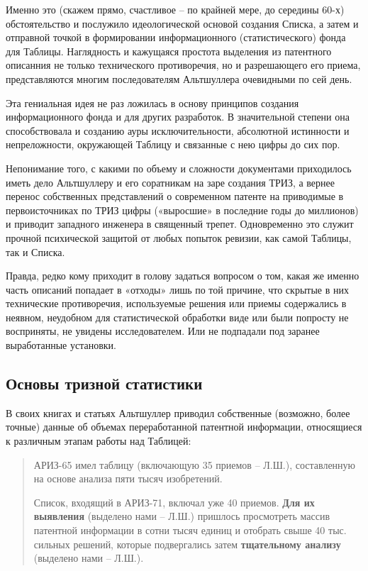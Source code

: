 \documentclass[11pt,a4paper]{article}
\begin{document}
Именно это (скажем прямо, счастливое -- по крайней мере, до середины 60-х)
обстоятельство и послужило идеологической основой создания Списка, а затем и
отправной точкой в формировании информационного (статистического) фонда для
Таблицы. Наглядность и кажущаяся простота выделения из патентного описанния не
только технического противоречия, но и разрешающего его приема, представляются
многим последователям Альтшуллера очевидными по сей день.

Эта гениальная идея не раз ложилась в основу принципов создания
информационного фонда и для других разработок. В значительной степени она
способствовала и созданию ауры исключительности, абсолютной истинности и
непреложности, окружающей Таблицу и связанные с нею цифры до сих пор.

Непонимание того, с какими по объему и сложности документами приходилось иметь
дело Альтшуллеру и его соратникам на заре создания ТРИЗ, а вернее перенос
собственных представлений о современном патенте на приводимые в
первоисточниках по ТРИЗ цифры («выросшие» в последние годы до миллионов) и
приводит западного инженера в священный трепет. Одновременно это служит
прочной психической защитой от любых попыток ревизии, как самой Таблицы, так и
Списка.

Правда, редко кому приходит в голову задаться вопросом о том, какая же именно
часть описаний попадает в «отходы» лишь по той причине, что скрытые в них
технические противоречия, используемые решения или приемы содержались в
неявном, неудобном для статистической обработки виде или были попросту не
восприняты, не увидены исследователем. Или не подпадали под заранее
выработанные установки.

\subsection*{Основы тризной статистики}

В своих книгах и статьях Альтшуллер приводил собственные (возможно, более
точные) данные об объемах переработанной патентной информации, относящиеся к
различным этапам работы над Таблицей:
\begin{quote}
  АРИЗ-65 имел таблицу (включающую 35 приемов -- Л.Ш.), составленную на основе
  анализа пяти тысяч изобретений.  \cite[стр. 139]{Altshuller1973}

  Список, входящий в АРИЗ-71, включал уже 40 приемов. \textbf{Для их
    выявления} (выделено нами -- Л.Ш.) пришлось просмотреть массив патентной
  информации в сотни тысяч единиц и отобрать свыше 40 тыс. сильных решений,
  которые подвергались затем \textbf{тщательному анализу} (выделено нами --
  Л.Ш.).  \cite[стр. 83]{Altshuller1979}
\end{quote}
\end{document}
